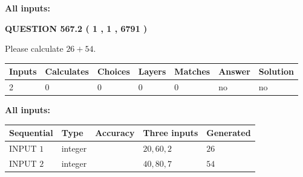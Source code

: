 \documentclass[12pt]{article}
\begin{document}
   
   
   
\noindent{}
   
   
   
   
\noindent\vspace{0.1in}\hspace{-0.08in} {\textbf{\Large{All inputs: }}}
   
   
  
\vspace{0.2in}
  
{\textbf{\Large{QUESTION
567.2 
 ( 1 , 1 , 6791 )
}}}
  
  
 
Please calculate $ %
26 +  %
54 $.
 
 
   
   
   
   
\noindent\begin{tabular}{|l|l|l|l|l|l|l|}
 \hline
Inputs & Calculates & Choices & Layers & Matches & Answer & Solution \\ \hline
 2  & 
 0  & 
 0
  & 
 0  & 
 0  & 
  no & 
  no 
  \\ \hline
 \end{tabular}
   
   
   
   
\noindent{}
   
   
   
   
\noindent\vspace{0.1in}\hspace{-0.08in} {\textbf{\Large{All inputs: }}}
   
   
  
  
\noindent\begin{tabular}{|l|l|l|l|l|}
\hline
 Sequential & Type & Accuracy & Three inputs & Generated \\ 
\hline
 
 
  INPUT $  1 $ & integer &  & $
 20
 , 
 60
 , 
 2
 $ & $ 26 $ 
 \\  \hline  
 
 
  INPUT $  2 $ & integer &  & $
 40
 , 
 80
 , 
 7
 $ & $ 54 $ 
 \\  \hline  
 \end{tabular}
   
   
   
   
   
   
 \vspace{0.2in}
 
\end{document}
